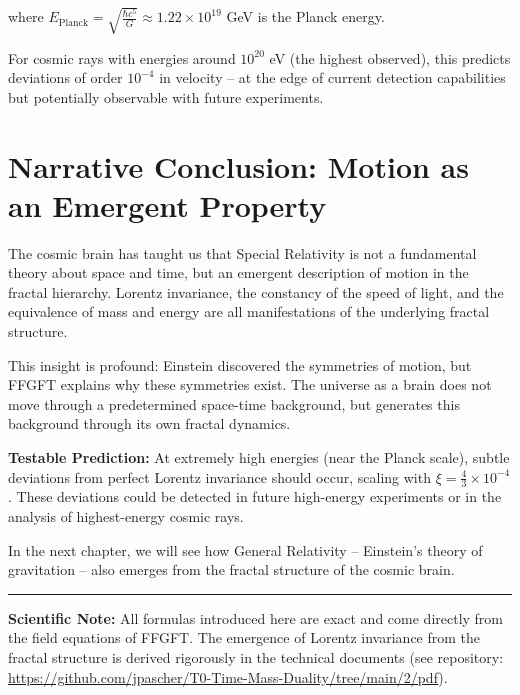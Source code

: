 where $E_{\text{Planck}} = \sqrt{\frac{\hbar c^5}{G}} \approx 1.22 \times 10^{19}$ GeV is the Planck energy.

For cosmic rays with energies around $10^{20}$ eV (the highest observed), this predicts deviations of order $10^{-4}$ in velocity -- at the edge of current detection capabilities but potentially observable with future experiments.

\section*{Narrative Conclusion: Motion as an Emergent Property}

The cosmic brain has taught us that Special Relativity is not a fundamental theory about space and time, but an emergent description of motion in the fractal hierarchy. Lorentz invariance, the constancy of the speed of light, and the equivalence of mass and energy are all manifestations of the underlying fractal structure.

This insight is profound: Einstein discovered the symmetries of motion, but FFGFT explains why these symmetries exist. The universe as a brain does not move through a predetermined space-time background, but generates this background through its own fractal dynamics.

\textbf{Testable Prediction:} At extremely high energies (near the Planck scale), subtle deviations from perfect Lorentz invariance should occur, scaling with $\xi = \frac{4}{3} \times 10^{-4}$. These deviations could be detected in future high-energy experiments or in the analysis of highest-energy cosmic rays.

In the next chapter, we will see how General Relativity -- Einstein's theory of gravitation -- also emerges from the fractal structure of the cosmic brain.

\vspace{1cm}
\hrule
\vspace{0.5cm}
\noindent\textbf{Scientific Note:} All formulas introduced here are exact and come directly from the field equations of FFGFT. The emergence of Lorentz invariance from the fractal structure is derived rigorously in the technical documents (see repository: \url{https://github.com/jpascher/T0-Time-Mass-Duality/tree/main/2/pdf}).



